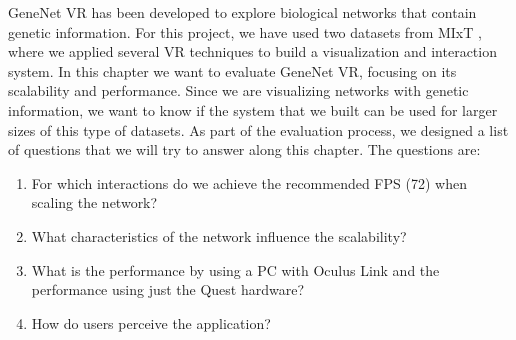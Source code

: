 


GeneNet VR has been developed to explore biological networks that contain genetic information. For this project, we have used two datasets from MIxT \cite{dumeaux_fjukstad_interactions_tumor_blood}, where we applied several VR techniques to build a visualization and interaction system. In this chapter we want to evaluate GeneNet VR, focusing on its scalability and performance. Since we are visualizing networks with genetic information, we want to know if the system that we built can be used for larger sizes of this type of datasets. As part of the evaluation process, we designed a list of questions that we will try to answer along this chapter. The questions are:
\begin{enumerate}
  \item For which interactions do we achieve the recommended FPS (72) when scaling the network?
  \item What characteristics of the network influence the scalability?
  \item What is the performance by using a PC with Oculus Link and the performance using just the Quest hardware?
  \item How do users perceive the application?
\end{enumerate}

